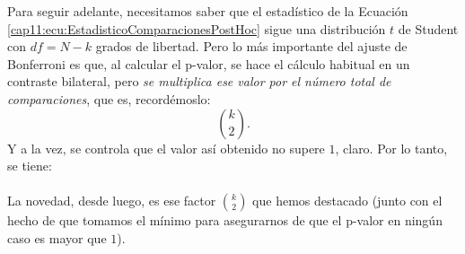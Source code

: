 Para seguir adelante, necesitamos saber que el estadístico de la Ecuación \ref{cap11:ecu:EstadisticoComparacionesPostHoc} sigue una distribución $t$ de Student con $df=N-k$ grados de libertad.  Pero lo más importante del ajuste de Bonferroni es que, al calcular el p-valor, se hace el cálculo habitual en un contraste bilateral, pero {\em se multiplica ese valor por el número total de comparaciones}, que es, recordémoslo:
\[\binom{k}{2}.\]
Y a la vez, se controla que el valor así obtenido no supere $1$, claro. Por lo tanto, se tiene:\\

    \\[3mm]
La novedad, desde luego, es ese factor $\binom{k}{2}$ que hemos destacado (junto con el hecho de que  tomamos el mínimo para asegurarnos de que el p-valor en ningún caso es mayor que $1$).

